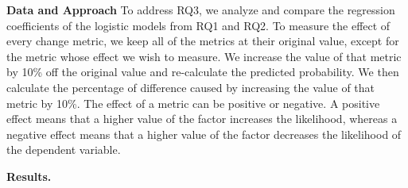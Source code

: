 


\noindent \textbf{Data and Approach}
To address RQ3, we analyze and compare the regression coefficients of the logistic models from RQ1 and RQ2. To measure the effect of every change metric, we keep all of the metrics at their original value, except for the metric whose effect we wish to measure. We increase the value of that metric by 10\% off the original value and re-calculate the predicted probability. We then calculate the percentage of difference caused by increasing the value of that metric by 10\%. The effect of a metric can be positive or negative. A positive effect means that a higher value of the factor increases the likelihood, whereas a negative effect means that a higher value of the factor decreases the likelihood of the dependent variable.

\noindent \textbf{Results.}





